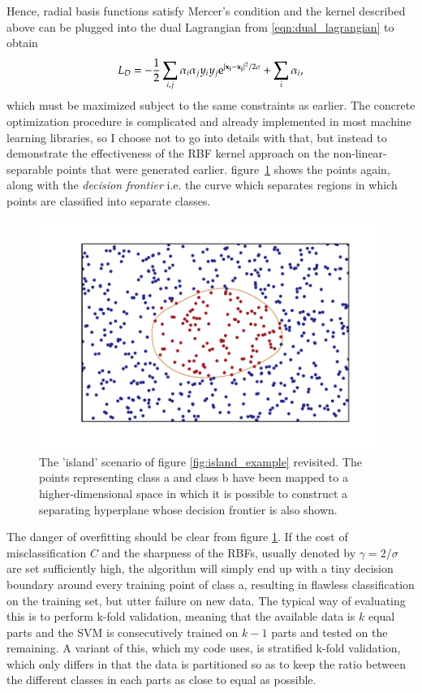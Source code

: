 Hence, radial basis functions satisfy Mercer's condition and the kernel described above can be plugged into the dual Lagrangian from \eqref{eqn:dual_lagrangian} to obtain
\begin{equation}
	L_D = -\frac{1}{2} \sum_{i,j} \alpha_i \alpha_j y_i y_j \mathrm{e}^{|\mathbf{x_i}-\mathbf{x_j}|^2/2\sigma} + \sum_i \alpha_i,
\end{equation}
which must be maximized subject to the same constraints as earlier. The concrete optimization procedure is complicated and already implemented in most machine learning libraries, so I choose not to go into details with that, but instead to demonstrate the effectiveness of the RBF kernel approach on the non-linear-separable points that were generated earlier. figure~\ref{fig:kernel_trick_example} shows the points again, along with the \textit{decision frontier} i.e. the curve which separates regions in which points are classified into separate classes.
\begin{figure}
	\centering
	\includegraphics[width = \figwidth]{pics/ml/kernel_example.pdf}
	\caption{The 'island' scenario of figure \ref{fig:island_example} revisited. The points representing {\color{moerkeroed} class a} and {\color{oldhat}class b} have been mapped to a higher-dimensional space in which it is possible to construct a separating hyperplane whose {\color{nude} decision frontier} is also shown.}
	\label{fig:kernel_trick_example}
\end{figure}
The danger of overfitting should be clear from figure \ref{fig:kernel_trick_example}. If the cost of misclassification $C$ and the sharpness of the RBFs, usually denoted by $\gamma=2/\sigma$ are set sufficiently high, the algorithm will simply end up with a tiny decision boundary around every training point of class a, resulting in flawless classification on the training set, but utter failure on new data.
The typical way of evaluating this is to perform k-fold validation, meaning that the available data is $k$ equal parts and the SVM is consecutively trained on $k-1$ parts and tested on the remaining. A variant of this, which my code uses, is stratified k-fold validation, which only differs in that the data is partitioned so as to keep the ratio between the different classes in each parts as close to equal as possible.

